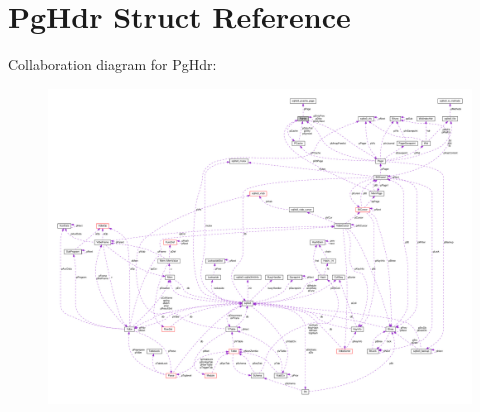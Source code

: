 \hypertarget{structPgHdr}{}\section{Pg\+Hdr Struct Reference}
\label{structPgHdr}


Collaboration diagram for Pg\+Hdr\+:\nopagebreak
\begin{figure}[H]
\begin{center}
\leavevmode
\includegraphics[width=350pt]{structPgHdr__coll__graph}
\end{center}
\end{figure}
